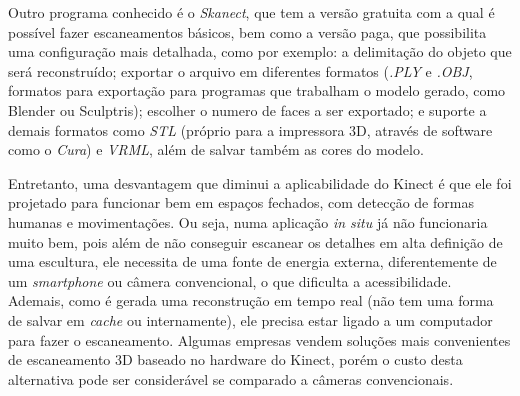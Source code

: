 Outro programa conhecido é o \emph{Skanect}, que tem a versão gratuita com a qual é possível fazer escaneamentos
básicos, bem como a versão paga, que possibilita uma configuração mais
detalhada, como por
exemplo: a delimitação do objeto que será reconstruído; exportar o arquivo em
diferentes formatos (\emph{.PLY} e \emph{.OBJ}, formatos para exportação para
programas que trabalham o modelo gerado, como Blender ou Sculptris);
escolher o numero de faces a ser exportado; e suporte a demais formatos como
\emph{STL} (próprio para a impressora 3D, através de software como o \emph{Cura})
e \emph{VRML}, além de salvar também as cores do modelo.

Entretanto, uma desvantagem que diminui a aplicabilidade do Kinect é que ele foi
projetado para funcionar bem em espaços fechados, com detecção de formas humanas
e movimentações. Ou seja, numa aplicação \emph{in situ} já não funcionaria muito
bem, pois além de não conseguir escanear os detalhes em alta definição de uma
escultura, ele necessita de uma fonte de energia externa, diferentemente de um
\emph{smartphone} ou câmera convencional, o que dificulta a acessibilidade.
Ademais, como é gerada uma reconstrução em tempo real (não tem uma forma de salvar em
\emph{cache} ou internamente), ele precisa estar ligado a um computador para fazer o escaneamento.
Algumas empresas vendem soluções mais convenientes de escaneamento 3D baseado no
hardware do Kinect, porém o custo desta alternativa pode ser considerável se
comparado a câmeras convencionais.

